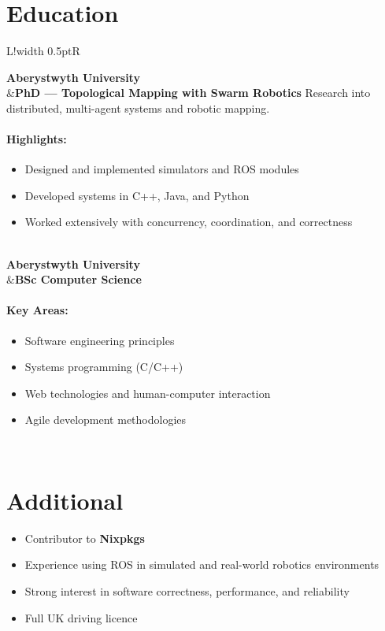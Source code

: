 \documentclass[10pt]{article}
\newcommand\VRule{\color{lightgray}\vrule width 0.5pt}
\begin{document}
\section*{Education}
\begin{longtable}{L!{\VRule}R}

{\bf Aberystwyth University}\\
&{\bf PhD — Topological Mapping with Swarm Robotics}\newline
Research into distributed, multi-agent systems and robotic mapping.

\vspace{-3mm}
\paragraph{Highlights:}
\begin{itemize}[noitemsep,topsep=0pt]
    \item Designed and implemented simulators and ROS modules
    \item Developed systems in C++, Java, and Python
    \item Worked extensively with concurrency, coordination, and correctness
\end{itemize}
\\

{\bf Aberystwyth University}\\
&{\bf BSc Computer Science}\newline
\vspace{-3mm}
\paragraph{Key Areas:}
\begin{itemize}[noitemsep,topsep=0pt]
    \item Software engineering principles
    \item Systems programming (C/C++)
    \item Web technologies and human-computer interaction
    \item Agile development methodologies
\end{itemize}
\\

\end{longtable}

\section*{Additional}
\begin{itemize}[noitemsep,topsep=0pt]
    \item Contributor to \textbf{Nixpkgs}
    \item Experience using ROS in simulated and real-world robotics environments
    \item Strong interest in software correctness, performance, and reliability
    \item Full UK driving licence
\end{itemize}
\end{document}
